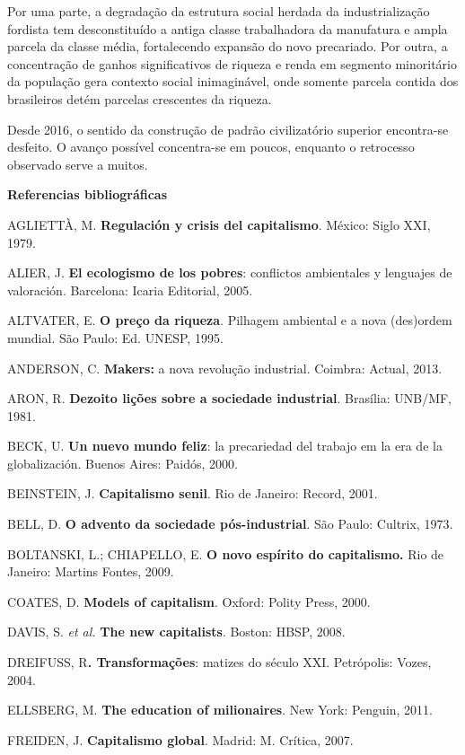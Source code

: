 Por uma parte, a degradação da estrutura social herdada da
industrialização fordista tem desconstituído a antiga classe
trabalhadora da manufatura e ampla parcela da classe média, fortalecendo
expansão do novo precariado. Por outra, a concentração de ganhos
significativos de riqueza e renda em segmento minoritário da população
gera contexto social inimaginável, onde somente parcela contida dos
brasileiros detém parcelas crescentes da riqueza.

Desde 2016, o sentido da construção de padrão civilizatório superior
encontra-se desfeito. O avanço possível concentra-se em poucos, enquanto
o retrocesso observado serve a muitos.

\textbf{Referencias bibliográficas}

AGLIETTÀ, M. \textbf{Regulación y crisis del capitalismo}. México: Siglo
XXI, 1979.

ALIER, J. \textbf{El ecologismo de los pobres}: conflictos ambientales y
lenguajes de valoración. Barcelona: Icaria Editorial, 2005.

ALTVATER, E. \textbf{O preço da riqueza}. Pilhagem ambiental e a nova
(des)ordem mundial. São Paulo: Ed. UNESP, 1995.

ANDERSON, C. \textbf{Makers:} a nova revolução industrial. Coimbra:
Actual, 2013.

ARON, R. \textbf{Dezoito lições sobre a sociedade industrial}. Brasília:
UNB/MF, 1981.

BECK, U. \textbf{Un nuevo mundo feliz}: la precariedad del trabajo em la
era de la globalización. Buenos Aires: Paidós, 2000.

BEINSTEIN, J. \textbf{Capitalismo senil}. Rio de Janeiro: Record, 2001.

BELL, D. \textbf{O advento da sociedade pós-industrial}. São Paulo:
Cultrix, 1973.

BOLTANSKI, L.; CHIAPELLO, E. \textbf{O novo espírito do capitalismo.}
Rio de Janeiro: Martins Fontes, 2009.

COATES, D. \textbf{Models of capitalism}. Oxford: Polity Press, 2000.

DAVIS, S. \emph{et al.} \textbf{The new capitalists}. Boston: HBSP,
2008.

DREIFUSS, R\textbf{. Transformações}: matizes do século XXI. Petrópolis:
Vozes, 2004.

ELLSBERG, M. \textbf{The education of milionaires}. New York: Penguin,
2011.

FREIDEN, J. \textbf{Capitalismo global}. Madrid: M. Crítica, 2007.

